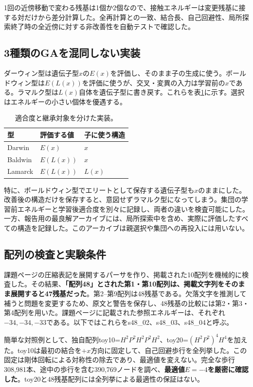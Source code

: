 1回の近傍移動で変わる残基は1個か2個なので、接触エネルギーは変更残基に接する対だけから差分計算した。全再計算との一致、結合長、自己回避性、局所探索終了時の全近傍に対する非改善性を自動テストで確認した。

\subsection{3種類のGAを混同しない実装}
ダーウィン型は遺伝子型$x$の$E(x)$を評価し、そのまま子の生成に使う。ボールドウィン型は$E(L(x))$を評価に使うが、交叉・変異の入力は学習前の$x$である。ラマルク型は$L(x)$自体を遺伝子型に書き戻す。これらを表\ref{tab:hp-inheritance}に示す。選択はエネルギーの小さい個体を優遇する。

\begin{table}[htbp]
\centering
\small
\caption{適合度と継承対象を分けた実装。}
\label{tab:hp-inheritance}
\begin{tabular}{lll}
\hline
型 & 評価する値 & 子に使う構造\\
\hline
Darwin & $E(x)$ & $x$\\
Baldwin & $E(L(x))$ & $x$\\
Lamarck & $E(L(x))$ & $L(x)$\\
\hline
\end{tabular}
\end{table}

特に、ボールドウィン型でエリートとして保存する遺伝子型も$x$のままにした。改善後の構造だけを保存すると、意図せずラマルク型になってしまう。集団の学習前エネルギーと学習後適合度を別々に記録し、両者の違いを検査可能にした。一方、報告用の最良解アーカイブには、局所探索中を含め、実際に評価したすべての構造を記録した。このアーカイブは親選択や集団への再投入には用いない。

\subsection{配列の検査と実験条件}
課題ページの圧縮表記を展開するパーサを作り、掲載された10配列を機械的に検査した。その結果、\textbf{「配列48」とされた第1・第10配列は、掲載文字列をそのまま展開すると47残基だった}。第2--第9配列は48残基である。欠落文字を推測して補うと問題を変更するため、原文と警告を保存し、48残基の比較には第2・第3・第4配列を用いた。課題ページに記載された参照エネルギーは、それぞれ$-34,-34,-33$である。以下ではこれらをs48\_02、s48\_03、s48\_04と呼ぶ。

簡単な対照例として、独自配列toy10=$H^2P^2H^2P^2H^2$、toy20=$(H^2P^2)^4H^4$を加えた。toy10は最初の結合を$+x$方向に固定して、自己回避歩行を全列挙した。この固定は剛体回転による対称性の除去であり、最適値を変えない。完全な歩行308,981本、途中の歩行を含む390,769ノードを調べ、\textbf{最適値$E=-4$を厳密に確認した}。toy20と48残基配列には全列挙による最適性の保証はない。

